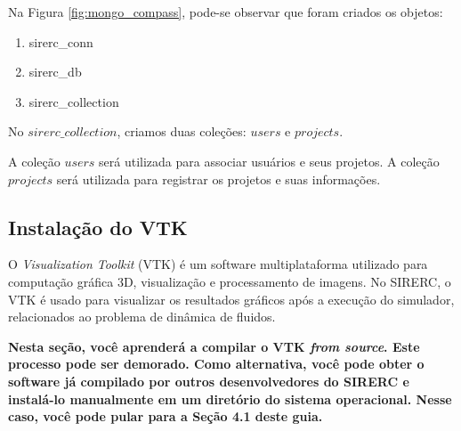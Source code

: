 \documentclass[a4paper,11pt]{article}
\newcommand{\sistema}{\textsf{SIRERC}}
\newcommand{\cautionbox}[1]{
	\vskip 5mm
	\begin{leftbar}
		\textbf{#1}
	\end{leftbar}
	\vskip 5mm
}
\begin{document}
Na Figura \ref{fig:mongo_compass}, pode-se observar que foram criados os objetos:
\begin{enumerate}
\item sirerc\_conn
\item sirerc\_db
\item sirerc\_collection
\end{enumerate}

No $sirerc\_collection$, criamos duas coleções: $users$ e $projects$.

A coleção $users$ será utilizada para associar usuários e seus projetos. A coleção $projects$ será utilizada para registrar os projetos e suas informações. 








\subsection{Instalação do VTK}

O \emph{Visualization Toolkit} (VTK) é um software multiplataforma utilizado para computação gráfica 3D, visualização e processamento de imagens. No \sistema{}, o VTK é usado para visualizar os resultados gráficos após a execução do simulador, relacionados ao problema de dinâmica de fluidos.

\cautionbox{
	Nesta seção, você aprenderá a compilar o VTK \emph{from source}. Este processo pode ser demorado. Como alternativa, você pode obter o software já compilado por outros desenvolvedores do \sistema{} e instalá-lo manualmente em um diretório do sistema operacional. Nesse caso, você pode pular para a Seção 4.1 deste guia.
}
\end{document}
